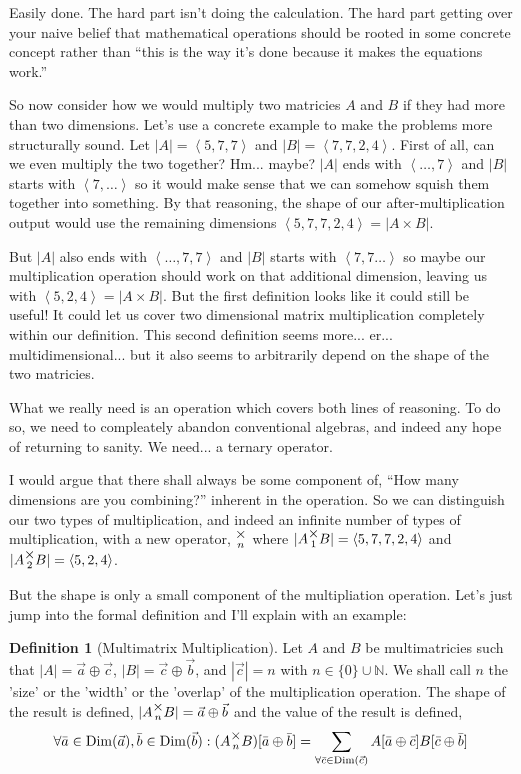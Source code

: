\documentclass[12pt]{book}
\theoremstyle{plain}
\theoremstyle{definition}
\newtheorem{definition}{Definition}[chapter]
\theoremstyle{ppart}
\theoremstyle{case}
\theoremstyle{solution}
\DeclareMathOperator{\Dim}{Dim}
\newcommand{\mmult}[1]{\text{\raisebox{1ex}{$\underset{#1}{\times}$}}}
\begin{document}
Easily done. The hard part isn't doing the calculation. The hard part getting over
your naive belief that mathematical operations should be rooted in some concrete
concept rather than ``this is the way it's done because it makes the equations
work.''

So now consider how we would multiply two matricies $A$ and $B$ if they had more
than two dimensions. Let's use a concrete example to make the problems more
structurally sound.
Let $|A| = \left<5,7,7\right>$ and $|B| = \left<7,7,2,4\right>$.
First of all, can we even multiply the two together? Hm... maybe? $|A|$ ends with
$\left<\ldots, 7\right>$ and $|B|$ starts with $\left<7,\ldots\right>$ so it would
make sense that we can somehow squish them together into something. By that reasoning,
the shape of our after-multiplication output would use the remaining dimensions
$\left<5, 7, 7, 2, 4\right> = |A \times B|$.

But $|A|$ also ends with $\left<\ldots, 7, 7\right>$ and $|B|$ starts with
$\left<7, 7\ldots\right>$ so maybe our multiplication operation should work on that
additional dimension, leaving us with $\left<5, 2, 4\right> = |A \times B|$.
But the first definition looks like it could still be useful! It could let us cover 
two dimensional matrix multiplication completely within our definition. This second
definition seems more... er... multidimensional... but it also seems to
arbitrarily depend on the shape of the two matricies.

What we really need is an operation which covers both lines of reasoning. To do
so, we need to compleately abandon conventional algebras, and indeed any hope of
returning to sanity. We need... a ternary operator.

I would argue that there shall always be some component of, 
``How many dimensions are you combining?'' inherent
in the operation. So we can distinguish our two types of multiplication, and indeed
an infinite number of types of multiplication, with a new operator, $\mmult{n}$ where
$|A \mmult{1} B| = \left<5, 7, 7, 2, 4\right>$ and 
$|A \mmult{2} B| = \left<5, 2, 4\right>$.

But the shape is only a small component of the multipliation  operation. Let's
just jump into the formal definition and I'll explain with an example:

\begin{definition}[Multimatrix Multiplication]
\label{mm_mult}
Let $A$ and $B$ be multimatricies such that $|A| = \vec{a} \oplus \vec{c}$,
$|B| = \vec{c} \oplus \vec{b}$, and $|\vec{c}| = n$ with
$n \in \{0\} \cup \mathbb{N}$. We shall call $n$ the 'size' or the 'width'
or the 'overlap' of the multiplication operation.
The shape of the result is defined, $|A \mmult{n} B| = \vec{a} \oplus \vec{b}$
and the value of the result is defined,
\[
\forall \bar{a} \in \Dim(\vec{a}), \bar{b} \in \Dim(\vec{b}):
(A \mmult{n}  B)[\bar{a} \oplus \bar{b}] =
\sum_{\forall \bar{c} \in \Dim(\vec{c})}
  A[\bar{a} \oplus \bar{c}] B[\bar{c} \oplus \bar{b}]
\]
\end{definition}
\end{document}
